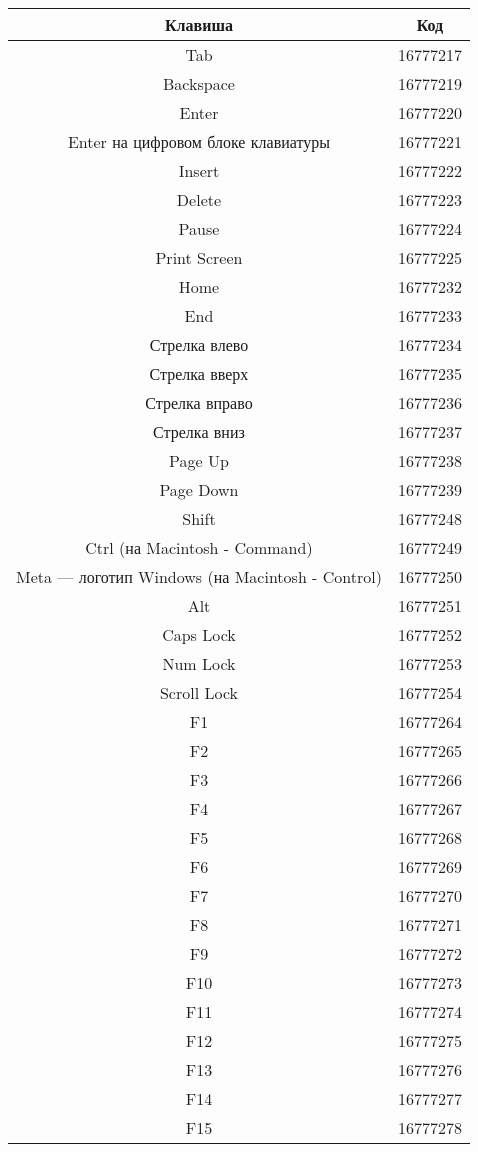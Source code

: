 \documentclass[12pt,a4paper]{article}
\begin{document}
\begin{center}
\begin{tabular}{||c|c||}
\hline
\hline
\textbf{Клавиша} & \textbf{Код}\\
\hline
Tab &
16777217\\
Backspace &
16777219\\
Enter &
16777220\\
Enter на цифровом блоке клавиатуры &
16777221\\
Insert &
16777222\\
Delete &
16777223\\
Pause &
16777224\\
Print Screen &
16777225\\
Home &
16777232\\
End &
16777233\\
Стрелка влево &
16777234\\
Стрелка вверх &
16777235\\
Стрелка вправо &
16777236\\
Стрелка вниз &
16777237\\
Page Up &
16777238\\
Page Down &
16777239\\
Shift &
16777248\\
Ctrl (на Macintosh - Command) &
16777249\\
Meta --- логотип Windows (на Macintosh - Control) &
16777250\\
Alt &
16777251\\
Caps Lock &
16777252\\
Num Lock &
16777253\\
Scroll Lock &
16777254\\
F1 &
16777264\\
F2 &
16777265\\
F3 &
16777266\\
F4 &
16777267\\
F5 &
16777268\\
F6 &
16777269\\
F7 &
16777270\\
F8 &
16777271\\
F9 &
16777272\\
F10 &
16777273\\
F11 &
16777274\\
F12 &
16777275\\
F13 &
16777276\\
F14 &
16777277\\
F15 &
16777278\\
\hline
\hline
\end{tabular}
\end{center}
\end{document}

